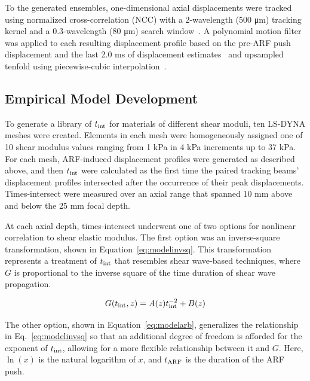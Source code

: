 

To the generated ensembles, one-dimensional axial displacements were tracked using normalized cross-correlation (NCC) with a 2-wavelength (500 \si{\micro\meter}) tracking kernel and a 0.3-wavelength (80 \si{\micro\meter}) search window~\cite{pinton_Rapid_2006}. A polynomial motion filter was applied to each resulting displacement profile based on the pre-ARF push displacement and the last 2.0 ms of displacement estimates~\cite{giannantonio_Comparison_2011} and upsampled tenfold using piecewise-cubic interpolation~\cite{fritsch_Monotone_1980}. 

\subsection{Empirical Model Development}

To generate a library of $t_{\textnormal{int}}$ for materials of different shear moduli, ten LS-DYNA meshes were created. Elements in each mesh were homogeneously assigned one of 10 shear modulus values ranging from 1 kPa in 4 kPa increments up to 37 kPa. For each mesh, ARF-induced displacement profiles were generated as described above, and then $t_{\textnormal{int}}$ were calculated as the first time the paired tracking beams' displacement profiles intersected after the occurrence of their peak displacements. Times-intersect were measured over an axial range that spanned 10 mm above and below the 25 mm focal depth.

At each axial depth, times-intersect underwent one of two options for nonlinear correlation to shear elastic modulus. The first option was an inverse-square transformation, shown in Equation~\ref{eq:modelinvsq}. This transformation represents a treatment of $t_{\textnormal{int}}$ that resembles shear wave-based techniques, where $G$ is proportional to the inverse square of the time duration of shear wave propagation. 

\begin{equation}
G(t_{\textnormal{int}}, z) = A(z) t_{\textnormal{int}}^{-2} + B(z)
\label{eq:modelinvsq}
\end{equation}

The other option, shown in Equation~\ref{eq:modelarb}, generalizes the relationship in Eq.~\ref{eq:modelinvsq} so that an additional degree of freedom is afforded for the exponent of $t_{\textnormal{int}}$, allowing for a more flexible relationship between it and $G$. Here, $\ln\left(x\right)$ is the natural logarithm of $x$, and $t_{\textnormal{ARF}}$ is the duration of the ARF push.

